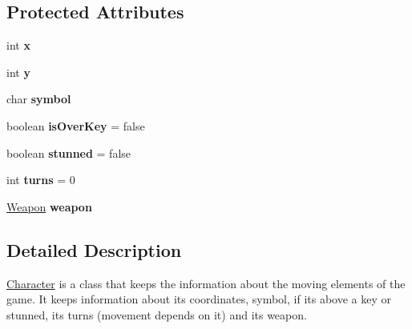 \subsection*{Protected Attributes}
\begin{DoxyCompactItemize}
\item 
\mbox{\label{classdkeep_1_1logic_1_1_character_aa1674c0adfcc7425cccd957ce594b8ed}} 
int {\bfseries x}
\item 
\mbox{\label{classdkeep_1_1logic_1_1_character_a2b1ff3a7a088a91798ddb264ff37e897}} 
int {\bfseries y}
\item 
\mbox{\label{classdkeep_1_1logic_1_1_character_a6ae027052136fb9b1c89851f4ed68fd3}} 
char {\bfseries symbol}
\item 
\mbox{\label{classdkeep_1_1logic_1_1_character_ad00f5df3d896d30368c2b25b92452a5b}} 
boolean {\bfseries is\+Over\+Key} = false
\item 
\mbox{\label{classdkeep_1_1logic_1_1_character_a556deb48a158574080c8e144c80ea1d9}} 
boolean {\bfseries stunned} = false
\item 
\mbox{\label{classdkeep_1_1logic_1_1_character_a474a59d32601ec8153b6b751d7fc1b25}} 
int {\bfseries turns} = 0
\item 
\mbox{\label{classdkeep_1_1logic_1_1_character_a0ce79e6c96b912490371d589c7e8420e}} 
\hyperlink{classdkeep_1_1logic_1_1_weapon}{Weapon} {\bfseries weapon}
\end{DoxyCompactItemize}


\subsection{Detailed Description}
\hyperlink{classdkeep_1_1logic_1_1_character}{Character} is a class that keeps the information about the moving elements of the game. It keeps information about it\textquotesingle{}s coordinates, symbol, if it\textquotesingle{}s above a key or stunned, it\textquotesingle{}s turns (movement depends on it) and it\textquotesingle{}s weapon. 

